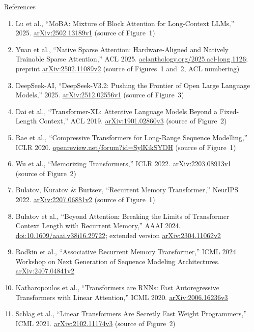 \begin{frame}[allowframebreaks,t]{References}
\begin{enumerate}
    \item Lu et al., ``MoBA: Mixture of Block Attention for Long-Context LLMs,'' 2025. \href{https://arxiv.org/abs/2502.13189v1}{arXiv:2502.13189v1} (source of Figure~1)
    \item Yuan et al., ``Native Sparse Attention: Hardware-Aligned and Natively Trainable Sparse Attention,'' ACL 2025. \href{https://aclanthology.org/2025.acl-long.1126/}{aclanthology.org/2025.acl-long.1126}; preprint \href{https://arxiv.org/abs/2502.11089v2}{arXiv:2502.11089v2} (source of Figures~1 and~2, ACL numbering)
    \item DeepSeek-AI, ``DeepSeek-V3.2: Pushing the Frontier of Open Large Language Models,'' 2025. \href{https://arxiv.org/abs/2512.02556v1}{arXiv:2512.02556v1} (source of Figure~3)
    \item Dai et al., ``Transformer-XL: Attentive Language Models Beyond a Fixed-Length Context,'' ACL 2019. \href{https://arxiv.org/abs/1901.02860v3}{arXiv:1901.02860v3} (source of Figure~2)
    \item Rae et al., ``Compressive Transformers for Long-Range Sequence Modelling,'' ICLR 2020. \href{https://openreview.net/forum?id=SylKikSYDH}{openreview.net/forum?id=SylKikSYDH} (source of Figure~1)
    \item Wu et al., ``Memorizing Transformers,'' ICLR 2022. \href{https://arxiv.org/abs/2203.08913v1}{arXiv:2203.08913v1} (source of Figure~2)
    \item Bulatov, Kuratov \& Burtsev, ``Recurrent Memory Transformer,'' NeurIPS 2022. \href{https://arxiv.org/abs/2207.06881v2}{arXiv:2207.06881v2} (source of Figure~1)
    \item Bulatov et al., ``Beyond Attention: Breaking the Limits of Transformer Context Length with Recurrent Memory,'' AAAI 2024. \href{https://doi.org/10.1609/aaai.v38i16.29722}{doi:10.1609/aaai.v38i16.29722}; extended version \href{https://arxiv.org/abs/2304.11062v2}{arXiv:2304.11062v2}
    \item Rodkin et al., ``Associative Recurrent Memory Transformer,'' ICML 2024 Workshop on Next Generation of Sequence Modeling Architectures. \href{https://arxiv.org/abs/2407.04841v2}{arXiv:2407.04841v2}
    \item Katharopoulos et al., ``Transformers are RNNs: Fast Autoregressive Transformers with Linear Attention,'' ICML 2020. \href{https://arxiv.org/abs/2006.16236v3}{arXiv:2006.16236v3}
    \item Schlag et al., ``Linear Transformers Are Secretly Fast Weight Programmers,'' ICML 2021. \href{https://arxiv.org/abs/2102.11174v3}{arXiv:2102.11174v3} (source of Figure~2)

\end{enumerate}
\end{frame}

